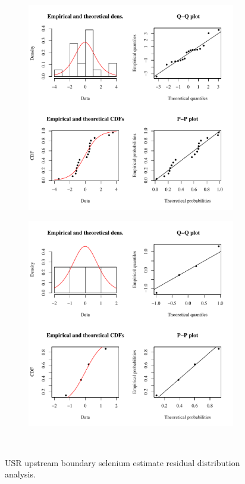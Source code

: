 \subfiguremid
\begin{landscape}
	\begin{figure}
		\begin{subfigure}{0.7\textwidth}
			\centering
			\includegraphics[width=\tableCustomSize]{"Figures/Results_USR/Stochastic/Conc Model res-fit TIM"}
		\end{subfigure}%
		\begin{subfigure}{0.7\textwidth}
			\centering
			\includegraphics[width=\tableCustomSize]{"Figures/Results_USR/Stochastic/Conc Model res-fit HRC"}
		\end{subfigure}\\
		\caption{USR upstream boundary selenium estimate residual distribution analysis.}
	\end{figure}
\end{landscape}

